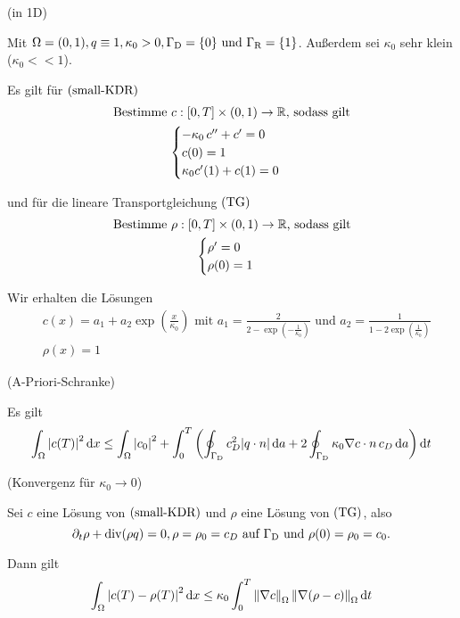 \begin{examples}(in 1D)
	\label{1D-Bsp}

	Mit $ \Omega = (0,1), q \equiv 1, \kappa_0 > 0, \Gamma_{\text{D}} = \{0\} \text{ und } \Gamma_{\text{R}} = \{1\}$. Außerdem sei $ \kappa_0 $ sehr klein ($ \kappa_0 << 1 $).
	
	Es gilt für $ \operatorname{(small-KDR)} $
	\begin{gather*}
	\text{Bestimme }  c:[0,T] \times (0,1) \to \mathbb{R} \text{, sodass gilt}\\
	\begin{cases}
		-\kappa_0 \, c'' + c' = 0 \\
		c(0) = 1  \\
		\kappa_0 c'(1) + c(1) = 0
	\end{cases}
	\end{gather*}
	
	und für die lineare Transportgleichung $ \operatorname{(TG)} $
	\begin{gather}
		\text{Bestimme } \rho:[0,T] \times (0,1) \to \mathbb{R} \text{, sodass gilt}\\
		\begin{cases}
			\rho' = 0\\
			\rho(0) = 1
		\end{cases}
	\end{gather}
	
	Wir erhalten die Lösungen
	\begin{align*}
		&c(x) = a_1 + a_2 \exp(\frac{x}{\kappa_0}) \text{ mit } a_1 = \frac{2}{2 - \exp(- \frac{1}{\kappa_0})} \text{ und } a_2 = \frac{1}{1 - 2 \exp(\frac{1}{\kappa_0})}\\
		&\rho(x) = 1
	\end{align*}
\end{examples}

\begin{Lemma}(A-Priori-Schranke)
	
	Es gilt
	\begin{align*}
		\int_\Omega \abs{c(T)}^2 \mathop{}\!\mathrm{d} x \leq \int_\Omega \abs{c_0}^2 + \int_{0}^{T} \left( \oint_{\Gamma_{\text{D}}} c_D^2 \abs{q \cdot n} \mathop{}\!\mathrm{d} a + 2 \oint_{\Gamma_{\text{D}}} \kappa_0 \nabla c \cdot n \, c_D \mathop{}\!\mathrm{d} a\right) \mathop{}\!\mathrm{d} t
	\end{align*}
\end{Lemma}

\begin{Lemma}(Konvergenz für $ \kappa_0 \to 0 $)
	
	Sei $ c $ eine Lösung von $ \operatorname{(small-KDR)} $ und $ \rho $ eine Lösung von $ \operatorname{(TG)} $, also 
	\[ \partial_t \rho + \operatorname{div}(\rho q) = 0, \rho = \rho_0 = c_D \text{ auf } \Gamma_{\text{D}} \text{ und }  \rho(0) = \rho_0 = c_0.  \]
	
	Dann gilt 
	\[ \int_\Omega \abs{c(T) - \rho(T)}^2 \mathop{}\!\mathrm{d} x \leq \kappa_0 \int_{0}^{T} \norm{\nabla c}_\Omega\, \norm{\nabla(\rho - c)}_\Omega \mathop{}\!\mathrm{d} t \]
\end{Lemma}

